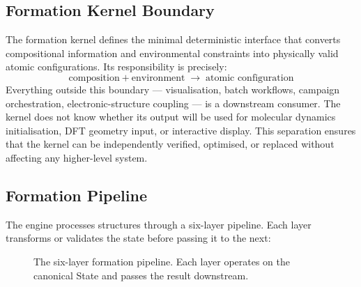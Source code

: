 \documentclass[11pt,twoside]{article}
\begin{document}
\subsection{Formation Kernel Boundary}
\label{sec:kernel-boundary}

The formation kernel defines the minimal deterministic interface that converts compositional information and environmental constraints into physically valid atomic configurations. Its responsibility is precisely:
\[
  \text{composition} + \text{environment} \;\longrightarrow\; \text{atomic configuration}
\]
Everything outside this boundary --- visualisation, batch workflows, campaign orchestration, electronic-structure coupling --- is a downstream consumer. The kernel does not know whether its output will be used for molecular dynamics initialisation, DFT geometry input, or interactive display. This separation ensures that the kernel can be independently verified, optimised, or replaced without affecting any higher-level system.

\subsection{Formation Pipeline}

The engine processes structures through a six-layer pipeline. Each layer transforms or validates the state before passing it to the next:

\begin{figure}[H]
\centering
{}
\caption{The six-layer formation pipeline. Each layer operates on the canonical State and passes the result downstream.}
\label{fig:pipeline}
\end{figure}
\end{document}
